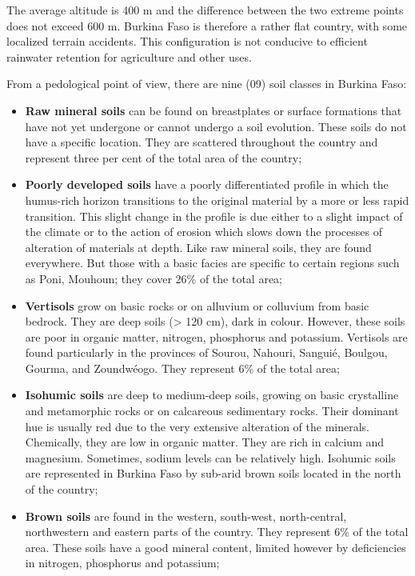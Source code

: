 \documentclass[
]{book}
\begin{document}
The average altitude is 400 m and the difference between the two extreme points does not exceed 600 m. Burkina Faso is therefore a rather flat country, with some localized terrain accidents. This configuration is not conducive to efficient rainwater retention for agriculture and other uses.

From a pedological point of view, there are nine (09) soil classes in Burkina Faso:

\begin{itemize}
\item
  \textbf{Raw mineral soils} can be found on breastplates or surface formations that have not yet undergone or cannot undergo a soil evolution. These soils do not have a specific location. They are scattered throughout the country and represent three per cent of the total area of the country;
\item
  \textbf{Poorly developed soils} have a poorly differentiated profile in which the humus-rich horizon transitions to the original material by a more or less rapid transition. This slight change in the profile is due either to a slight impact of the climate or to the action of erosion which slows down the processes of alteration of materials at depth. Like raw mineral soils, they are found everywhere. But those with a basic facies are specific to certain regions such as Poni, Mouhoun; they cover 26\% of the total area;
\item
  \textbf{Vertisols} grow on basic rocks or on alluvium or colluvium from basic bedrock. They are deep soils (\textgreater{} 120 cm), dark in colour. However, these soils are poor in organic matter, nitrogen, phosphorus and potassium. Vertisols are found particularly in the provinces of Sourou, Nahouri, Sanguié, Boulgou, Gourma, and Zoundwéogo. They represent 6\% of the total area;
\item
  \textbf{Isohumic soils} are deep to medium-deep soils, growing on basic crystalline and metamorphic rocks or on calcareous sedimentary rocks. Their dominant hue is usually red due to the very extensive alteration of the minerals. Chemically, they are low in organic matter. They are rich in calcium and magnesium. Sometimes, sodium levels can be relatively high. Isohumic soils are represented in Burkina Faso by sub-arid brown soils located in the north of the country;
\item
  \textbf{Brown soils} are found in the western, south-west, north-central, northwestern and eastern parts of the country. They represent 6\% of the total area. These soils have a good mineral content, limited however by deficiencies in nitrogen, phosphorus and potassium;

\end{itemize}
\end{document}
